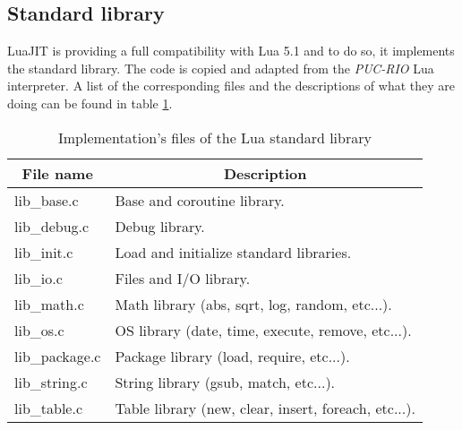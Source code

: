 

\subsection{Standard library}
\label{Subsec:std-lib}

LuaJIT is providing a full compatibility with Lua 5.1 and to do so, it
implements the standard library. The code is copied and adapted from the
\emph{PUC-RIO} Lua interpreter. A list of the corresponding files and the
descriptions of what they are doing can be found in table
\ref{tab:library-std-files}.

\begin{table}[H]
\centering
\caption{Implementation's files of the Lua standard library}
\label{tab:library-std-files}
\begin{tabular}{|l|l|}
\hline
\multicolumn{1}{|c|}{File name} & \multicolumn{1}{c|}{Description}                     \\ \hline
lib\_base.c                     & Base and coroutine library.                          \\
lib\_debug.c                    & Debug library.                                       \\
lib\_init.c                     & Load and initialize standard libraries.              \\
lib\_io.c                       & Files and I/O library.                               \\
lib\_math.c                     & Math library (abs, sqrt, log, random, etc...).       \\
lib\_os.c                       & OS library (date, time, execute, remove, etc...).    \\
lib\_package.c                  & Package library (load, require, etc...).             \\
lib\_string.c                   & String library (gsub, match, etc...).                \\
lib\_table.c                    & Table library (new, clear, insert, foreach, etc...). \\ \hline
\end{tabular}
\end{table}


